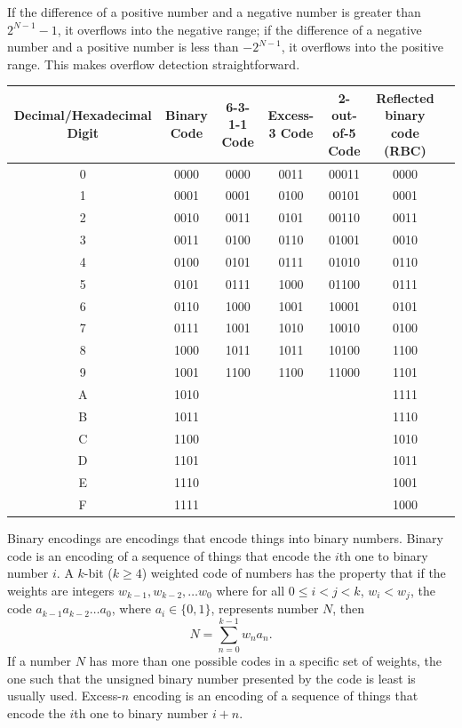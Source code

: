 \documentclass[a4paper,12pt]{report}
\begin{document}
If the difference of a positive number and a negative number is greater than $2^{N-1}-1$, it overflows into the negative range; if the difference of a negative number and a positive number is less than $-2^{N-1}$, it overflows into the positive range. This makes overflow detection straightforward.
\begin{longtable}[c]{|c|c|c|c|c|c|c|}
\hline
Decimal/Hexadecimal Digit & Binary Code & 6-3-1-1 Code & Excess-3 Code & 2-out-of-5 Code & Reflected binary code (RBC)\\\hline
0 & 0000 & 0000 & 0011 & 00011 & 0000\\\hline
1 & 0001 & 0001 & 0100 & 00101 & 0001\\\hline
2 & 0010 & 0011 & 0101 & 00110 & 0011\\\hline
3 & 0011 & 0100 & 0110 & 01001 & 0010\\\hline
4 & 0100 & 0101 & 0111 & 01010 & 0110\\\hline
5 & 0101 & 0111 & 1000 & 01100 & 0111\\\hline
6 & 0110 & 1000 & 1001 & 10001 & 0101\\\hline
7 & 0111 & 1001 & 1010 & 10010 & 0100\\\hline
8 & 1000 & 1011 & 1011 & 10100 & 1100\\\hline
9 & 1001 & 1100 & 1100 & 11000 & 1101\\\hline
A & 1010 & & & & 1111\\\hline
B & 1011 & & & & 1110\\\hline
C & 1100 & & & & 1010\\\hline
D & 1101 & & & & 1011\\\hline
E & 1110 & & & & 1001\\\hline
F & 1111 & & & & 1000\\\hline
\end{longtable}\FB
{}
Binary encodings are encodings that encode things into binary numbers.
Binary code is an encoding of a sequence of things that encode the $i$th one to binary number $i$.
A $k$-bit ($k\geq 4$) weighted code of numbers has the property that if the weights are integers $w_{k-1}, w_{k-2}, \ldots w_0$ where for all $0\leq i<j<k$, $w_i<w_j$, the code $a_{k-1}a_{k-2}\ldots a_0$, where $a_i\in\{0,1\}$, represents number $N$, then
\[N = \sum_{n=0}^{k-1}w_na_n.\]
If a number $N$ has more than one possible codes in a specific set of weights, the one such that the unsigned binary number presented by the code is least is usually used.
Excess-$n$ encoding is an encoding of a sequence of things that encode the $i$th one to binary number $i+n$. 
\end{document}

